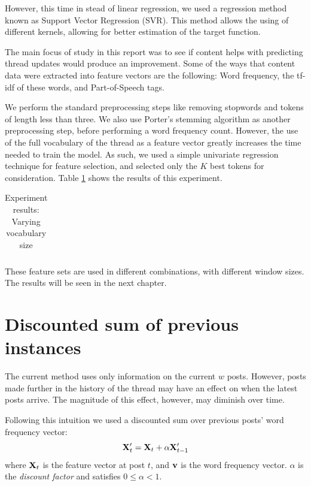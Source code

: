 However, this time in stead of linear regression, we used a regression method 
known as Support Vector Regression (SVR). This method allows the using of 
different kernels, allowing for better estimation of the target function.

The main focus of study in this report was to see if content helps with 
predicting thread updates would produce an improvement. Some of the ways that 
content data were extracted into feature vectors are the following: Word 
frequency, the tf-idf of these words, and Part-of-Speech tags.

We perform the standard preprocessing steps like removing stopwords and tokens 
of length less than three. We also use Porter's stemming algorithm as another 
preprocessing step, before performing a word frequency count. However, the use 
of the full vocabulary of the thread as a feature vector greatly increases the 
time needed to train the model. As such, we used a simple univariate regression 
technique for feature selection, and selected only the $K$ best tokens for 
consideration. Table \ref{table:vocab_exp} shows the results of this experiment.  

\begin{table}
	\footnotesize
	\begin{centering}
	\begin{tabular}{|l|c|c|c|c|c|c|c|c|}
	\hline
	
	\hline
	\end{tabular}
	\caption{Experiment results: Varying vocabulary size}
	\label{table:vocab_exp}
\end{centering}
\end{table}


These feature sets are used in different combinations, with different window 
sizes. The results will be seen in the next chapter.

\section{Discounted sum of previous instances}
The current method uses only information on the current $w$ posts. However, 
posts made further in the history of the thread may have an effect on when the 
latest posts arrive. The magnitude of this effect, however, may diminish over 
time.

Following this intuition we used a discounted sum over previous posts' word 
frequency vector:
\[
	\mathbf{X}'_t = \mathbf{X}_t + \alpha \mathbf{X}'_{t-1}
\]
where $\mathbf{X}_t$ is the feature vector at post $t$, and $\mathbf{v}$ is the word 
frequency vector. $\alpha$ is the \emph{discount factor} and satisfies $0 \leq 
\alpha < 1$.

